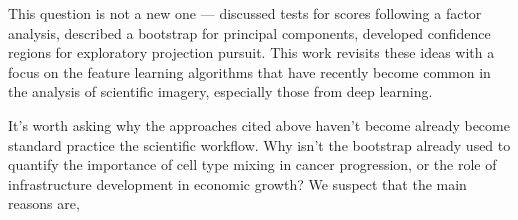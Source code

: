 This question is not a new one — \cite{rao1955estimation} discussed tests for scores following a factor analysis, \cite{diaconis1983computer} described a bootstrap for principal components, \cite{elguero1988confidence} developed confidence regions for exploratory projection pursuit. This work revisits these ideas with a focus on the feature learning algorithms that have recently become common in the analysis of scientific imagery, especially those from deep learning.

It’s worth asking why the approaches cited above haven’t become already become standard practice the scientific workflow. Why isn’t the bootstrap already used to quantify the importance of cell type mixing in cancer progression, or the role of infrastructure development in economic growth? We suspect that the main reasons are,

